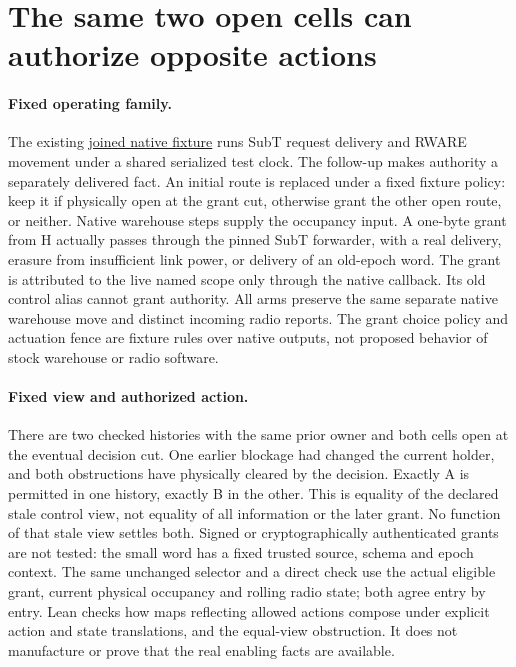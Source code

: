 \documentclass{article}
\begin{document}
\section*{The same two open cells can authorize opposite actions}
\paragraph{Fixed operating family.}
The existing \href{https://github.com/eternal-november/eos-research-programmes/pull/812}{joined native fixture}
runs SubT request delivery and RWARE movement under a shared serialized test
clock. The follow-up makes authority a separately delivered fact. An initial
route is replaced under a fixed fixture policy: keep it if physically open at
the grant cut, otherwise grant the other open route, or neither. Native
warehouse steps supply the occupancy input. A one-byte grant from H
actually passes through the pinned SubT forwarder, with a real delivery,
erasure from insufficient link power, or delivery of an old-epoch word.
The grant is attributed to the live named scope only through the native
callback. Its old control alias cannot grant authority. All arms preserve
the same separate native warehouse move and distinct incoming radio reports.
The grant choice policy and actuation fence are fixture rules over native
outputs, not proposed behavior of stock warehouse or radio software.

\paragraph{Fixed view and authorized action.}
There are two checked histories with the same prior owner and both cells
open at the eventual decision cut. One earlier blockage had changed the current
holder, and both obstructions have physically cleared by the decision.
Exactly A is permitted in one history, exactly B in the other. This is
equality of the declared stale control view, not equality of all
information or the later grant. No function of that stale view settles
both. Signed or cryptographically authenticated grants are not tested:
the small word has a fixed trusted source, schema and epoch context.
The same unchanged selector and a direct check use the actual eligible
grant, current physical occupancy and rolling radio state; both agree
entry by entry. Lean checks how maps reflecting allowed actions compose
under explicit action and state translations, and the equal-view
obstruction. It does not manufacture or prove that the real enabling
facts are available.
\end{document}
